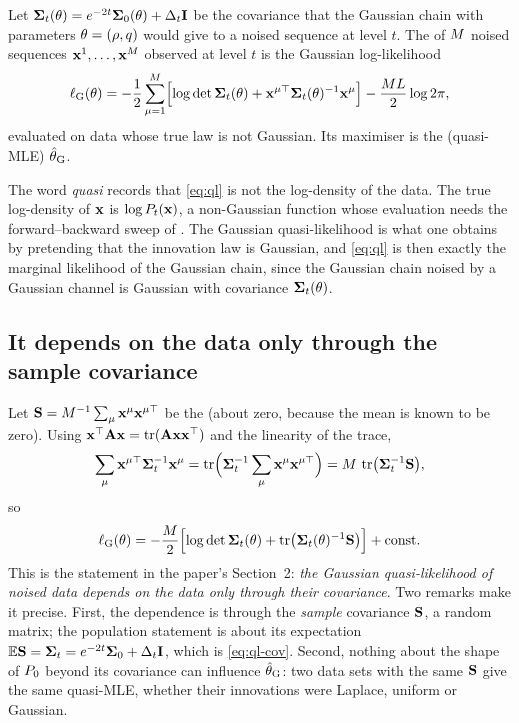 \begin{definition}
\label{def:ql}
Let $\mathbf{\Sigma}_t(\theta)=e^{-2t}\mathbf{\Sigma}_0(\theta)+\Delta_t\mathbf{I}$ be the covariance that the Gaussian
chain with parameters $\theta=(\rho,q)$ would give to a noised sequence at level $t$.
The  of $M$ noised sequences $\mathbf{x}^1,\dots,\mathbf{x}^{M}$
observed at level $t$ is the Gaussian log-likelihood
\begin{equation}
  \ell_{\mathrm G}(\theta)
  = -\frac{1}{2}\sum_{\mu=1}^{M}\Bigl[\log\det\mathbf{\Sigma}_t(\theta)
    + \mathbf{x}^{\mu\top}\mathbf{\Sigma}_t(\theta)^{-1}\mathbf{x}^{\mu}\Bigr] - \frac{ML}{2}\log 2\pi ,
  \label{eq:ql}
\end{equation}
evaluated on data whose true law is not Gaussian. Its maximiser is the
 (quasi-MLE) $\hat{\theta}_{\mathrm G}$.
\end{definition}

The word \emph{quasi} records that \cref{eq:ql} is not the log-density of the data. The
true log-density of $\mathbf{x}$ is $\log P_t(\mathbf{x})$, a non-Gaussian function whose evaluation
needs the forward--backward sweep of . The Gaussian
quasi-likelihood is what one obtains by pretending that the innovation law is Gaussian,
and \cref{eq:ql} is then exactly the marginal likelihood of the Gaussian chain, since the
Gaussian chain noised by a Gaussian channel is Gaussian with covariance $\mathbf{\Sigma}_t(\theta)$.

\subsection{It depends on the data only through the sample covariance}

Let $\mathbf{S}=M^{-1}\sum_\mu\mathbf{x}^\mu\mathbf{x}^{\mu\top}$ be the  (about
zero, because the mean is known to be zero). Using
$\mathbf{x}^\top\mathbf{A}\mathbf{x}=\operatorname{tr}(\mathbf{A}\mathbf{x}\mathbf{x}^\top)$ and the linearity of the trace,
\begin{equation}
  \sum_{\mu}\mathbf{x}^{\mu\top}\mathbf{\Sigma}_t^{-1}\mathbf{x}^\mu
  =\operatorname{tr}\Bigl(\mathbf{\Sigma}_t^{-1}\sum_\mu\mathbf{x}^\mu\mathbf{x}^{\mu\top}\Bigr)=M\,\operatorname{tr}\bigl(\mathbf{\Sigma}_t^{-1}\mathbf{S}\bigr),
\end{equation}
so
\begin{equation}
  \ell_{\mathrm G}(\theta)=-\frac{M}{2}\Bigl[\log\det\mathbf{\Sigma}_t(\theta)+\operatorname{tr}\bigl(\mathbf{\Sigma}_t(\theta)^{-1}\mathbf{S}\bigr)\Bigr]+\text{const}.
  \label{eq:ql-S}
\end{equation}
This is the statement in the paper's Section~2: \emph{the Gaussian quasi-likelihood of
noised data depends on the data only through their covariance}. Two remarks make it
precise. First, the dependence is through the \emph{sample} covariance $\mathbf{S}$, a
random matrix; the population statement is about its expectation
$\mathbb{E}\mathbf{S}=\mathbf{\Sigma}_t=e^{-2t}\mathbf{\Sigma}_0+\Delta_t\mathbf{I}$, which is \cref{eq:ql-cov}. Second, nothing about
the shape of $P_0$ beyond its covariance can influence $\hat{\theta}_{\mathrm G}$: two
data sets with the same $\mathbf{S}$ give the same quasi-MLE, whether their innovations were
Laplace, uniform or Gaussian.


